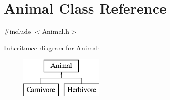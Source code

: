 \hypertarget{class_animal}{}\section{Animal Class Reference}
\label{class_animal}


{\ttfamily \#include $<$Animal.\+h$>$}

Inheritance diagram for Animal\+:\begin{figure}[H]
\begin{center}
\leavevmode
\includegraphics[height=2.000000cm]{class_animal}
\end{center}
\end{figure}
